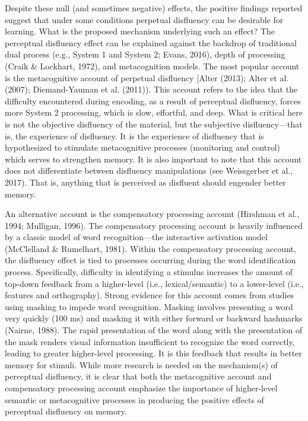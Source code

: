 \documentclass[
  english,
  jou]{apa7}
\begin{document}
Despite these null (and sometimes negative) effects, the positive findings reported suggest that under some conditions perpetual disfluency can be desirable for learning. What is the proposed mechanism underlying such an effect? The perceptual disfluency effect can be explained against the backdrop of traditional dual process (e.g., System 1 and System 2; Evans, 2016), depth of processing (Craik \& Lockhart, 1972), and metacognition models. The most popular account is the metacognitive account of perpetual disfluency {[}Alter (2013); Alter et al. (2007); Diemand-Yauman et al. (2011)). This account refers to the idea that the difficulty encountered during encoding, as a result of perceptual disfluency, forces more System 2 processing, which is slow, effortful, and deep. What is critical here is not the objective disfluency of the material, but the subjective disfluency---that is, the experience of disfluency. It is the experience of disfluency that is hypothesized to stimulate metacognitive processes (monitoring and control) which serves to strengthen memory. It is also important to note that this account does not differentiate between disfluency manipulations (see Weissgerber et al., 2017). That is, anything that is perceived as disfluent should engender better memory.

An alternative account is the compensatory processing account (Hirshman et al., 1994; Mulligan, 1996). The compensatory processing account is heavily influenced by a classic model of word recognition---the interactive activation model (McClelland \& Rumelhart, 1981). Within the compensatory processing account, the disfluency effect is tied to processes occurring during the word identification process. Specifically, difficulty in identifying a stimulus increases the amount of top-down feedback from a higher-level (i.e., lexical/semantic) to a lower-level (i.e., features and orthography). Strong evidence for this account comes from studies using masking to impede word recognition. Masking involves presenting a word very quickly (100 ms) and masking it with either forward or backward hashmarks (Nairne, 1988). The rapid presentation of the word along with the presentation of the mask renders visual information insufficient to recognize the word correctly, leading to greater higher-level processing. It is this feedback that results in better memory for stimuli. While more research is needed on the mechanism(s) of perceptual disfluency, it is clear that both the metacognitive account and compensatory processing account emphasize the importance of higher-level semantic or metacognitive processes in producing the positive effects of perceptual disfluency on memory.
\end{document}
